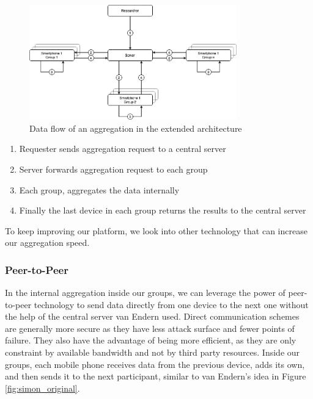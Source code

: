 \begin{figure}[htbp]
  \centering
  \includegraphics[width=0.8\textwidth]{figures/ar}
  \caption{Data flow of an aggregation in the extended architecture} \label{fig:ar}
\end{figure}

\begin{enumerate}
    \item Requester sends aggregation request to a central server
    \item Server forwards aggregation request to each group
    \item Each group, aggregates the data internally
    \item Finally the last device in each group returns the results to the central server
\end{enumerate}

To keep improving our platform, we look into other technology that can increase our aggregation speed.

\subsubsection{Peer-to-Peer}
In the internal aggregation inside our groups, we can leverage the power of peer-to-peer technology to send data directly from one device to the next one without the help of the central server van Endern used. Direct communication schemes are generally more secure as they have less attack surface and fewer points of failure. They also have the advantage of being more efficient, as they are only constraint by available bandwidth and not by third party resources. Inside our groups, each mobile phone receives data from the previous device, adds its own, and then sends it to the next participant, similar to van Endern's idea in Figure \ref{fig:simon_original}.


